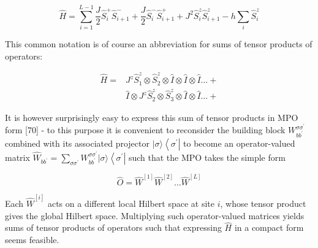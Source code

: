 \documentclass[12pt]{article}
\begin{document}
\begin{equation*}
\hat{H}=\sum_{i=1}^{L-1} \frac{J}{2} \hat{S}_{i}^{+} \hat{S}_{i+1}^{-}+\frac{J}{2} \hat{S}_{i}^{-} \hat{S}_{i+1}^{+}+J^{2} \hat{S}_{i}^{z} \hat{S}_{i+1}^{z}-h \sum_{i} \hat{S}_{i}^{z} \tag{182}
\end{equation*}


This common notation is of course an abbreviation for sums of tensor products of operators:

$$
\begin{aligned}
\hat{H}= & J^{z} \hat{S}_{1}^{z} \otimes \hat{S}_{2}^{z} \otimes \hat{I} \otimes \hat{I} \otimes \hat{I} \ldots+ \\
& \hat{I} \otimes J^{z} \hat{S}_{2}^{z} \otimes \hat{S}_{3}^{z} \otimes \hat{I} \otimes \hat{I} \ldots+
\end{aligned}
$$

It is however surprisingly easy to express this sum of tensor products in MPO form [70] - to this purpose it is convenient to reconsider the building block $W_{b b^{\prime}}^{\sigma \sigma^{\prime}}$ combined with its associated projector $|\sigma\rangle\left\langle\sigma^{\prime}\right|$ to become an operator-valued matrix $\hat{W}_{b b^{\prime}}=\sum_{\sigma \sigma^{\prime}} W_{b b^{\prime}}^{\sigma \sigma^{\prime}}|\sigma\rangle\left\langle\sigma^{\prime}\right|$ such that the MPO takes the simple form


\begin{equation*}
\hat{O}=\hat{W}^{[1]} \hat{W}^{[2]} \ldots \hat{W}^{[L]} \tag{183}
\end{equation*}


Each $\hat{W}^{[i]}$ acts on a different local Hilbert space at site $i$, whose tensor product gives the global Hilbert space. Multiplying such operator-valued matrices yields sums of tensor products of operators such that expressing $\hat{H}$ in a compact form seems feasible.
\end{document}
